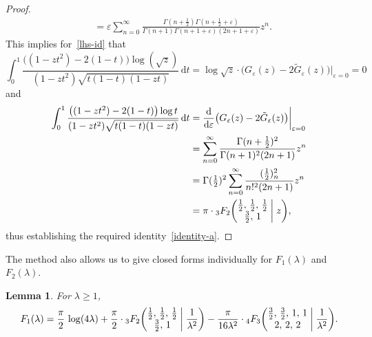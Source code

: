 \documentclass[12pt,reqno]{amsart}
\newtheorem{lemma}{Lemma}
\theoremstyle{remark}
\let\eps\varepsilon
\begin{document}
\begin{proof}
\begin{align*}
&=\eps\sum_{n=0}^\infty\frac{\Gamma(n+\frac12)\Gamma(n+\frac12+\eps)}{\Gamma(n+1)\Gamma(n+1+\eps)(2n+1+\eps)}z^n.
\end{align*}
This implies for~\eqref{lhs-id} that
$$
\int_0^1\frac{\bigl((1-zt^2)-2(1-t)\bigr)\log(\sqrt z)}{(1-zt^2)\sqrt{t(1-t)(1-zt)}}\,{{\mathrm d}} t
=\log\sqrt z\cdot\bigl(G_\eps(z)-2\tilde G_\eps(z)\bigr)\big|_{\eps=0}
=0
$$
and
\begin{align*}
\int_0^1\frac{\bigl((1-zt^2)-2(1-t)\bigr)\log t}{(1-zt^2)\sqrt{t(1-t)(1-zt)}}\,{{\mathrm d}} t
&=\frac{{\mathrm d}}{{{\mathrm d}}\eps}\bigl(G_\eps(z)-2\tilde G_\eps(z)\bigr)\bigg|_{\eps=0}
\\
&=\sum_{n=0}^\infty\frac{\Gamma(n+\frac12)^2}{\Gamma(n+1)^2(2n+1)}z^n
\\
&=\Gamma(\tfrac12)^2\sum_{n=0}^\infty\frac{(\frac12)_n^2}{n!^2(2n+1)}z^n
\\
&=\pi\cdot{}_3F_2\biggl(\begin{matrix} \frac12, \, \frac12, \, \frac12 \\ \frac32, \, 1 \end{matrix}\biggm|
z\biggr),
\end{align*}
thus establishing the required identity~\eqref{identity-a}.
\end{proof}

The method also allows us to give closed forms individually for $F_1(\lambda)$ and $F_2(\lambda)$.

\begin{lemma}
\label{lemk2}
For $\lambda\ge1$,
\begin{equation}
F_1(\lambda)
=\frac\pi2\,\log(4\lambda)
+\frac\pi2\cdot{}_3F_2\biggl(\begin{matrix} \frac12, \, \frac12, \, \frac12 \\
\frac32, \, 1 \end{matrix}\biggm| \frac1{\lambda^2}\biggr)
-\frac{\pi}{16\lambda^2}\cdot{}_4F_3\biggl(\begin{matrix} \frac32, \, \frac32, \, 1, \, 1 \\
2, \, 2, \, 2 \end{matrix}\biggm| \frac1{\lambda^2}\biggr).
\label{F1}
\end{equation}
\end{lemma}
\end{document}
